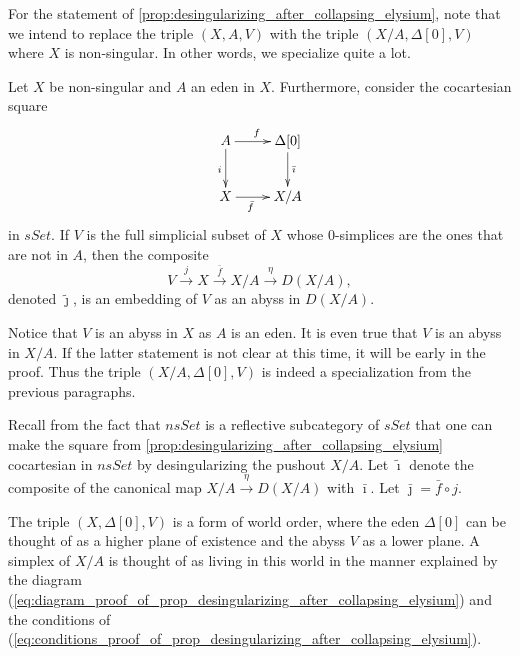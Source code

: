 For the statement of \cref{prop:desingularizing_after_collapsing_elysium}, note that we intend to replace the triple $(X,A,V)$ with the triple $(X/A,\Delta [0],V)$ where $X$ is non-singular. In other words, we specialize quite a lot.
\begin{proposition}\label{prop:desingularizing_after_collapsing_elysium}
Let $X$ be non-singular and $A$ an eden in $X$. Furthermore, consider the cocartesian square
\begin{displaymath}
\xymatrix{
  A \ar[d]_i \ar[r]^f & \Delta [0] \ar[d]^{\bar{\imath} } \\
  X \ar[r]_(.4){\bar{f} } & X/A
}
\end{displaymath}
in $sSet$. If $V$ is the full simplicial subset of $X$ whose $0$-simplices are the ones that are not in $A$, then the composite
\[V\xrightarrow{j} X\xrightarrow{\bar{f} } X/A\xrightarrow{\eta } D(X/A),\]
denoted $\tilde{\jmath }$, is an embedding of $V$ as an abyss in $D(X/A)$.
\end{proposition}
\noindent Notice that $V$ is an abyss in $X$ as $A$ is an eden. It is even true that $V$ is an abyss in $X/A$. If the latter statement is not clear at this time, it will be early in the proof. Thus the triple $(X/A,\Delta [0],V)$ is indeed a specialization from the previous paragraphs.

Recall from the fact that $nsSet$ is a reflective subcategory of $sSet$ that one can make the square from \cref{prop:desingularizing_after_collapsing_elysium} cocartesian in $nsSet$ by desingularizing the pushout $X/A$. Let $\tilde{\imath }$ denote the composite of the canonical map $X/A\xrightarrow{\eta } D(X/A)$ with $\bar{\imath }$. Let $\bar{\jmath } =\bar{f} \circ j$.

The triple $(X,\Delta [0],V)$ is a form of world order, where the eden $\Delta [0]$ can be thought of as a higher plane of existence and the abyss $V$ as a lower plane. A simplex of $X/A$ is thought of as living in this world in the manner explained by the diagram (\ref{eq:diagram_proof_of_prop_desingularizing_after_collapsing_elysium}) and the conditions of (\ref{eq:conditions_proof_of_prop_desingularizing_after_collapsing_elysium}).

